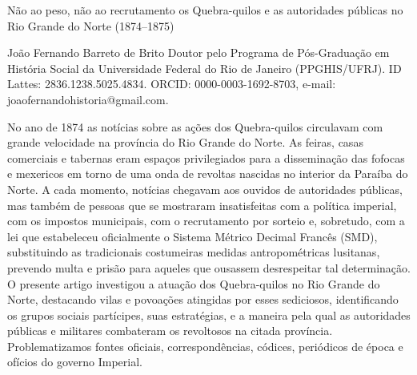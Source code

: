 \begin{refsection}
\renewcommand{\thefigure}{\arabic{figure}}

\chapterTwoLines
{Não ao peso, não ao recrutamento}
{os Quebra-quilos e as autoridades públicas no Rio Grande do Norte (1874--1875)}
\label{chap:naoaopeso}

\articleAuthor
{João Fernando Barreto de Brito}
{Doutor pelo Programa de Pós-Graduação em História Social da Universidade Federal do Rio de Janeiro (PPGHIS/UFRJ). ID Lattes: 2836.1238.5025.4834. ORCID: 0000-0003-1692-8703, e-mail: joaofernandohistoria@gmail.com.}

\begin{galoResumo}
    No ano de 1874 as notícias sobre as ações dos Quebra-quilos circulavam com grande velocidade na província do Rio Grande do Norte. As feiras, casas comerciais e tabernas eram espaços privilegiados para a disseminação das fofocas e mexericos em torno de uma onda de revoltas nascidas no interior da Paraíba do Norte. A cada momento, notícias chegavam aos ouvidos de autoridades públicas, mas também de pessoas que se mostraram insatisfeitas com a política imperial, com os impostos municipais, com o recrutamento por sorteio e, sobretudo, com a lei que estabeleceu oficialmente o Sistema Métrico Decimal Francês (SMD), substituindo as tradicionais costumeiras medidas antropométricas lusitanas, prevendo multa e prisão para aqueles que ousassem desrespeitar tal determinação. O presente artigo investigou a atuação dos Quebra-quilos no Rio Grande do Norte, destacando vilas e povoações atingidas por esses sediciosos, identificando os grupos sociais partícipes, suas estratégias, e a maneira pela qual as autoridades públicas e militares combateram os revoltosos na citada província. Problematizamos fontes oficiais, correspondências, códices, periódicos de época e ofícios do governo Imperial. 
\end{galoResumo}


\begin{otherlanguage}{english}


\end{otherlanguage}
\end{refsection}
